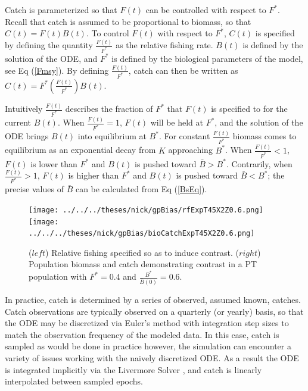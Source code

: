 \documentclass[12pt]{article}
\begin{document}
%
Catch is parameterized so that $F(t)$ can be controlled with respect to $F^*$. 
Recall that catch is assumed to be proportional to biomass, so that $C(t)=F(t)B(t)$.
To control $F(t)$ with respect to $F^*$, $C(t)$ is specified by defining the 
quantity $\frac{F(t)}{F^*}$ as the relative fishing rate. $B(t)$ is defined 
by the solution of the ODE, and $F^*$ is defined by the biological parameters 
of the model, see Eq (\ref{Fmsy}). By defining $\frac{F(t)}{F^*}$, catch 
can then be written as \mbox{$C(t)=F^*\left(\frac{F(t)}{F^*}\right)B(t)$.}

%
Intuitively $\frac{F(t)}{F^*}$ describes the fraction of $F^*$ that $F(t)$ is  
specified to for the current $B(t)$. When $\frac{F(t)}{F^*}=1$, $F(t)$ will be 
held at $F^*$, and the solution of the ODE brings $B(t)$ into equilibrium at 
$B^*$. For constant $\frac{F(t)}{F^*}$ biomass %
comes to equilibrium as an exponential decay from $K$ approaching $B^*$. 
When $\frac{F(t)}{F^*}<1$, $F(t)$ is lower than $F^*$ and $B(t)$ is pushed 
toward $\bar B>B^*$. Contrarily, when $\frac{F(t)}{F^*}>1$, $F(t)$ is higher 
than $F^*$ and $B(t)$ is pushed toward $\bar B<B^*$; the precise values of 
$\bar B$ can be calculated from Eq (\ref{BsEq}).

%
\begin{figure}[h!]
\texttt{[image: ../../../theses/nick/gpBias/rfExpT45X2Z0.6.png]}
\texttt{[image: ../../../theses/nick/gpBias/bioCatchExpT45X2Z0.6.png]}
\caption{ \label{catchT45}
($left$) Relative fishing specified so as to induce contrast.
($right$) Population biomass and catch demonstrating contrast in a {\color{red}PT population} with $F^*=0.4$ and $\frac{B^*}{\bar B(0)}=0.6$.
}
\end{figure}

%
In practice, catch is determined by a series of observed, assumed known, catches. 
Catch observations are typically observed on a quarterly (or yearly) basis, so 
that the ODE may be discretized via Euler’s method with integration step sizes 
to match the observation frequency of the modeled data. In this case, catch is sampled 
as would be done in practice however, the simulation can encounter a variety of issues 
working with the naively discretized ODE. As a result the ODE is integrated implicitly 
via the Livermore Solver , and catch 
is linearly interpolated between sampled epochs. 
\end{document}
